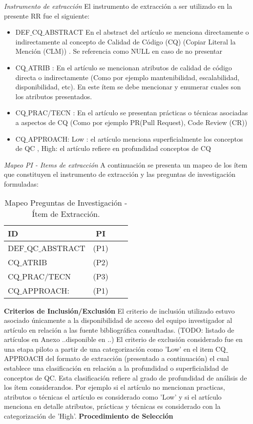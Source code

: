 \documentclass[conference]{IEEEtran}
\begin{document}
\textit{Instrumento de extracción}
El instrumento de extracción a ser utilizado en la presente RR fue el siguiente: 

\begin{itemize}
\item  DEF$\_$CQ$\_$ABSTRACT   En el abstract del artículo se menciona directamente o indirectamente al concepto de Calidad de Código (CQ) (Copiar Literal la Mención (CLM)) . Se referencia como NULL en caso de no presentar   
\item CQ$\_$ATRIB  :  En el artículo se mencionan atributos de calidad de código  directa o indirectamente  (Como por ejemplo  mantenibilidad, escalabilidad, disponibilidad, etc). En este ítem se debe mencionar y enumerar cuales son los atributos presentados.
\item CQ$\_$PRAC/TECN : En el artículo se presentan prácticas o técnicas asociadas a aspectos de CQ (Como por ejemplo PR(Pull Request), Code Review (CR))
\item CQ$\_$APPROACH: Low : el artículo menciona superficialmente los conceptos de QC , High: el artículo refiere en profundidad conceptos de CQ
\end{itemize}


\textit{Mapeo PI - Items de extracción}
 A continuación se presenta un mapeo de los ítem que constituyen  el instrumento de extracción y  las preguntas de investigación formuladas:
 
\begin{table}[htb]
\begin{center}
\label{t:map} 
\begin{tabular}{ |l|c|c|c| } 
\hline
ID & PI  \\
\hline
DEF$\_$QC$\_$ABSTRACT & (P1) \\ 
CQ$\_$ATRIB  & (P2) \\ 
CQ$\_$PRAC/TECN& (P3) \\ 
CQ$\_$APPROACH:  & (P1) \\ 

\hline

\end{tabular}
\end{center}
\caption{Mapeo Preguntas de Investigación - Ítem de Extracción.}
\end{table}


\textbf{Criterios de Inclusión/Exclusión}
El criterio de inclusión  utilizado estuvo asociado únicamente a la disponibilidad de acceso del equipo investigador al artículo en relación a las fuente bibliográfica consultadas. (TODO: listado de artículos en Anexo ..disponible en ..)
El criterio de exclusión considerado fue en una etapa piloto  a partir de una categorización  como 'Low' en el item CQ$\_$APPROACH del formato de extracción (presentado a continuación) el cual establece una clasificación en relación a la profundidad o superficialidad de conceptos de QC. Esta clasificación refiere al grado de profundidad de análisis de los ítem considerandos. Por ejemplo si el artículo no mencionan  practicas, atributos o técnicas el artículo es considerado como 'Low' y si el artículo menciona en detalle atributos, prácticas y técnicas es considerado con la categorización de 'High'.   
\textbf{Procedimiento de Selección}
\end{document}
